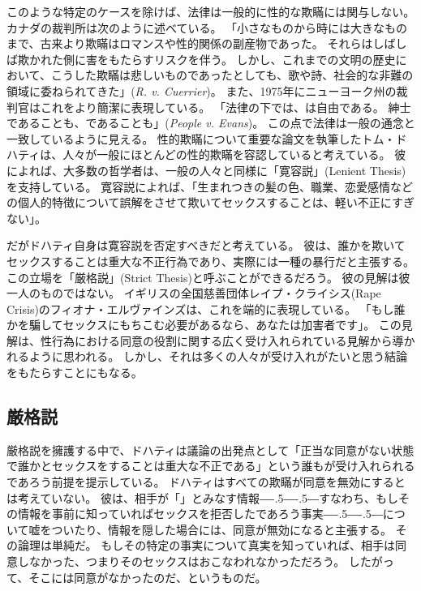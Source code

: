 \documentclass[paper=a4,book,openany]{jlreq}
\def\DDASH{―\kern-.5\zw―\kern-.5\zw―} %
\begin{document}
このような特定のケースを除けば、法律は一般的に性的な欺瞞には関与しない。
カナダの裁判所は次のように述べている。
「小さなものから時には大きなものまで、古来より欺瞞はロマンスや性的関係の副産物であった。
それらはしばしば欺かれた側に害をもたらすリスクを伴う。
しかし、これまでの文明の歴史において、こうした欺瞞は悲しいものであったとしても、歌や詩、社会的な非難の領域に委ねられてきた」(\emph{R. v. Cuerrier})。
また、1975年にニューヨーク州の裁判官はこれをより簡潔に表現している。
「法律の下では、は自由である。
紳士であることも、であることも」(\emph{People v. Evans})。
この点で法律は一般の通念と一致しているように見える。
性的欺瞞について重要な論文を執筆したトム・ドハティは、人々が一般にほとんどの性的欺瞞を容認していると考えている。
彼によれば、大多数の哲学者は、一般の人々と同様に「寛容説」(Lenient Thesis)を支持している。
寛容説によれば、「生まれつきの髪の色、職業、恋愛感情などの個人的特徴について誤解をさせて欺いてセックスすることは、軽い不正にすぎない」\citep[p.718]{dougherty13:_sex_lies_consen}。

だがドハティ自身は寛容説を否定すべきだと考えている。
彼は、誰かを欺いてセックスすることは重大な不正行為であり、実際には一種の暴行だと主張する。
この立場を「厳格説」(Strict Thesis)と呼ぶことができるだろう。
彼の見解は彼一人のものではない。
イギリスの全国慈善団体レイプ・クライシス(Rape Crisis)のフィオナ・エルヴァインズは、これを端的に表現している。
「もし誰かを騙してセックスにもちこむ必要があるなら、あなたは加害者です」\citep{sanghani14:_lied_your_way_sex}。
この見解は、性行為における同意の役割に関する広く受け入れられている見解から導かれるように思われる。
しかし、それは多くの人々が受け入れがたいと思う結論をもたらすことにもなる。

\subsection{厳格説}

厳格説を擁護する中で、ドハティは議論の出発点として「正当な同意がない状態で誰かとセックスをすることは重大な不正である」という誰もが受け入れられるであろう前提を提示している\citep[p.722]{dougherty13:_sex_lies_consen}。
ドハティはすべての欺瞞が同意を無効にするとは考えていない。
彼は、相手が「」とみなす情報{\DDASH}すなわち、もしその情報を事前に知っていればセックスを拒否したであろう事実{\DDASH}について嘘をついたり、情報を隠した場合には、同意が無効になると主張する。
その論理は単純だ。
もしその特定の事実について真実を知っていれば、相手は同意しなかった、つまりそのセックスはおこなわれなかっただろう。
したがって、そこには同意がなかったのだ、というものだ。
\end{document}
